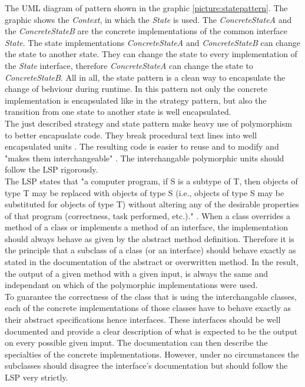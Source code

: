 The \ac{UML} diagram of pattern shown in the graphic \ref{picture:statepattern}. The graphic shows the \textit{Context}, in which the \textit{State} is used. The \textit{ConcreteStateA} and the \textit{ConcreteStateB} are the concrete implementations of the common interface \textit{State}. The state implementations  \textit{ConcreteStateA} and \textit{ConcreteStateB} can change the state to another state. They can change the state to every implementation of the \textit{State} interface, therefore \textit{ConcreteStateA} can change the state to \textit{ConcreteStateB}.
All in all, the state pattern is a clean way to encapsulate the change of behviour during runtime. In this pattern not only the concrete implementation is encapsulated like in the strategy pattern, but also the transition from one state to another state is well encapsulated. 
\\

The just described strategy and state pattern make heavy use of polymorphism to better encapuslate code. They break procedural text lines into well encapsulated units \cite{gof}. The resulting code is easier to reuse and to modify and "makes them interchangeable" \cite{gof}. The interchangable polymorphic units should follow the \ac{LSP} rigorously.
\\

The \ac{LSP} states that "a computer program, if S is a subtype of T, then objects of type T may be replaced with objects of type S (i.e., objects of type S may be substituted for objects of type T) without altering any of the desirable properties of that program (correctness, task performed, etc.)." \cite[Liskov Substitution Principle]{wiki}. When a class overrides a method of a class or implements a method of an interface, the implementation should always behave as given by the abstract method definition. Therefore it is the principle that a subclass of a class (or an interface) should behave exactly as stated in the documentation of the abstract or overwritten method. In the result, the output of a given method with a given input, is always the same and independant on which of the polymorphic implementations were used. 
\\

 To guarantee the correctness of the class that is using the interchangable classes, each of the concrete implementations of those classes have to behave exactly as their abstract specifications hence interfaces. These interfaces should be well documented and provide a clear description of what is expected to be the output on every possible given imput. The documentation can then describe the specialties of the concrete implementations. However, under no circumstances the subclasses should disagree the interface's documentation but should follow the \ac{LSP} very strictly. 
 \\

